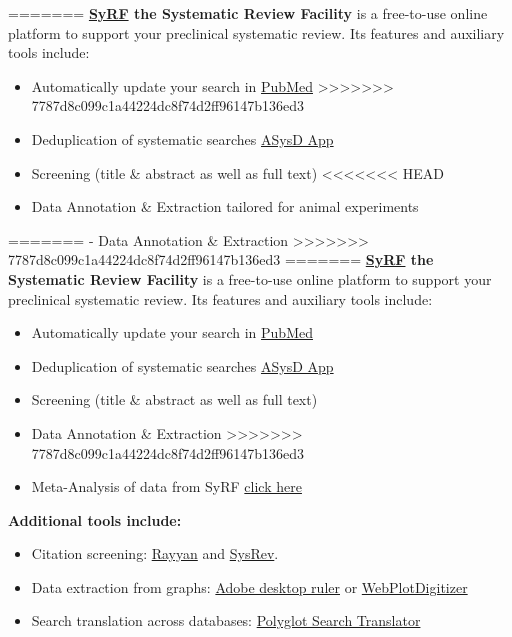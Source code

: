 \documentclass[
]{book}
\providecommand{\tightlist}{%
  \setlength{\itemsep}{0pt}\setlength{\parskip}{0pt}}
\begin{document}
=======
\textbf{\href{http://syrf.org.uk/}{SyRF} the Systematic Review Facility} is a free-to-use online platform to support your preclinical systematic review. Its features and auxiliary tools include:

\begin{itemize}
\item
  Automatically update your search in \href{https://pubmed.ncbi.nlm.nih.gov/}{PubMed}
  \textgreater\textgreater\textgreater\textgreater\textgreater\textgreater\textgreater{} 7787d8c099c1a44224dc8f74d2ff96147b136ed3
\item
  Deduplication of systematic searches \href{https://camarades.shinyapps.io/RDedup/}{ASysD App}
\item
  Screening (title \& abstract as well as full text)
  \textless\textless\textless\textless\textless\textless\textless{} HEAD
\item
  Data Annotation \& Extraction tailored for animal experiments
\end{itemize}

=======
- Data Annotation \& Extraction
\textgreater\textgreater\textgreater\textgreater\textgreater\textgreater\textgreater{} 7787d8c099c1a44224dc8f74d2ff96147b136ed3
=======
\textbf{\href{http://syrf.org.uk/}{SyRF} the Systematic Review Facility} is a free-to-use online platform to support your preclinical systematic review. Its features and auxiliary tools include:

\begin{itemize}
\tightlist
\item
  Automatically update your search in \href{https://pubmed.ncbi.nlm.nih.gov/}{PubMed}
\item
  Deduplication of systematic searches \href{https://camarades.shinyapps.io/RDedup/}{ASysD App}
\item
  Screening (title \& abstract as well as full text)
\item
  Data Annotation \& Extraction
  \textgreater\textgreater\textgreater\textgreater\textgreater\textgreater\textgreater{} 7787d8c099c1a44224dc8f74d2ff96147b136ed3
\item
  Meta-Analysis of data from SyRF \href{https://camarades.shinyapps.io/meta-analysis-app/}{click here}
\end{itemize}

\textbf{Additional tools include:}

\begin{itemize}
\tightlist
\item
  Citation screening: \href{https://rayyan.qcri.org/welcome}{Rayyan} and \href{https://sysrev.com/}{SysRev}.
\item
  Data extraction from graphs: \href{https://helpx.adobe.com/acrobat/using/grids-guides-measurements-pdfs.html}{Adobe desktop ruler} or \href{https://automeris.io/WebPlotDigitizer/}{WebPlotDigitizer}
\item
  Search translation across databases: \href{https://sr-accelerator.com/\#/polyglot}{Polyglot Search Translator}
\end{itemize}
\end{document}
